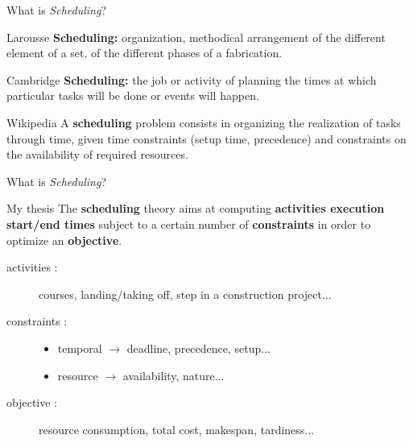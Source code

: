 \begin{frame}{What is {\it Scheduling}?}
  \vfill
  \begin{block}{Larousse}
    {\bf \color{bleuLAAS} Scheduling: }organization, methodical arrangement of the different
    element of a set, of the  different phases of a fabrication.
  \end{block}
  \vfill
  \begin{block}{Cambridge}
    {\bf  \color{bleuLAAS}  Scheduling: }the job or activity of planning the times at which particular tasks will be done or events will happen.
  \end{block}
  \vfill  
  \begin{block}{Wikipedia}
    A {\bf  \color{bleuLAAS}  scheduling} problem consists in organizing the realization of
    tasks through time, given time constraints (setup time, precedence)
    and constraints on the availability of required resources.
  \end{block}
  \vfill
\end{frame}

\begin{frame}{What is {\it Scheduling}?}
\vspace{0.3cm}
  \begin{block}{My thesis}
    The {\bf  \color{bleuLAAS} scheduling} theory aims at computing {\bf activities execution
      start/end times} subject to a certain number of {\bf
      constraints} in order to optimize an {\bf objective}.    
  \end{block}
  \vspace{0.6cm}
  \begin{description}
  \item[activities :]  courses, landing/taking off, step in a
    construction project... 
    \vspace{0.2cm}
  \item[constraints :]
    \begin{itemize}
    \item temporal $\rightarrow$ deadline, precedence, setup...
    \item resource $\rightarrow$ availability, nature... 
    \end{itemize}
    \vspace{0.2cm}
  \item[objective :] resource consumption, total cost, makespan,
    tardiness... 
    \vspace{0.2cm}
  \end{description}
\end{frame}

